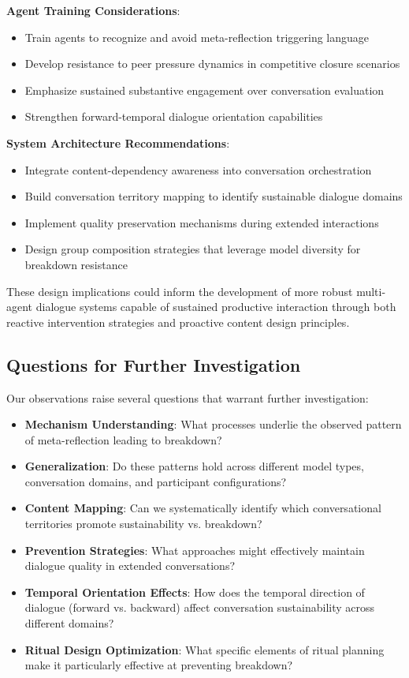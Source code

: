 \documentclass[11pt,letterpaper]{article}
\begin{document}
\textbf{Agent Training Considerations}:
\begin{itemize}
    \item Train agents to recognize and avoid meta-reflection triggering language
    \item Develop resistance to peer pressure dynamics in competitive closure scenarios
    \item Emphasize sustained substantive engagement over conversation evaluation
    \item Strengthen forward-temporal dialogue orientation capabilities
\end{itemize}

\textbf{System Architecture Recommendations}:
\begin{itemize}
    \item Integrate content-dependency awareness into conversation orchestration
    \item Build conversation territory mapping to identify sustainable dialogue domains
    \item Implement quality preservation mechanisms during extended interactions
    \item Design group composition strategies that leverage model diversity for breakdown resistance
\end{itemize}

These design implications could inform the development of more robust multi-agent dialogue systems capable of sustained productive interaction through both reactive intervention strategies and proactive content design principles.

\subsection{Questions for Further Investigation}

Our observations raise several questions that warrant further investigation:

\begin{itemize}
    \item \textbf{Mechanism Understanding}: What processes underlie the observed pattern of meta-reflection leading to breakdown?
    \item \textbf{Generalization}: Do these patterns hold across different model types, conversation domains, and participant configurations?
    \item \textbf{Content Mapping}: Can we systematically identify which conversational territories promote sustainability vs. breakdown?
    \item \textbf{Prevention Strategies}: What approaches might effectively maintain dialogue quality in extended conversations?
    \item \textbf{Temporal Orientation Effects}: How does the temporal direction of dialogue (forward vs. backward) affect conversation sustainability across different domains?
    \item \textbf{Ritual Design Optimization}: What specific elements of ritual planning make it particularly effective at preventing breakdown?
\end{itemize}
\end{document}
